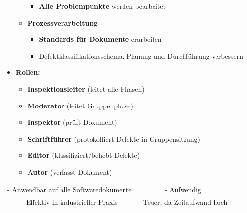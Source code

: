\begin{itemize}
\begin{itemize}
\begin{itemize}
\item \textbf{Alle Problempunkte} werden bearbeitet
\end{itemize}
\item \textbf{Prozessverarbeitung}
\begin{itemize}
\item \textbf{Standards für Dokumente} erarbeiten
\item Defektklassifikationsschema, Planung und Durchführung verbessern
\end{itemize}
\end{itemize}
\newpage
\item \textbf{Rollen:}
\begin{itemize}
\item \textbf{Inspektionsleiter} (leitet alle Phasen)
\item \textbf{Moderator} (leitet Gruppenphase)
\item \textbf{Inspektor} (prüft Dokument)
\item \textbf{Schriftführer} (protokolliert Defekte in Gruppensitzung)
\item \textbf{Editor} (klassifiziert/behebt Defekte)
\item \textbf{Autor} (verfasst Dokument)
\end{itemize}
\end{itemize}
	
\begin{center}
\begin{tabular}{c|c}
\color{green}{\textbf{+}} & \color{red}{\textbf{-}} \\
\hline
- Anwendbar auf alle Softwaredokumente & - Aufwendig \\
- Effektiv in industrieller Praxis & - Teuer, da Zeitaufwand hoch \\
\end{tabular}
\end{center}
